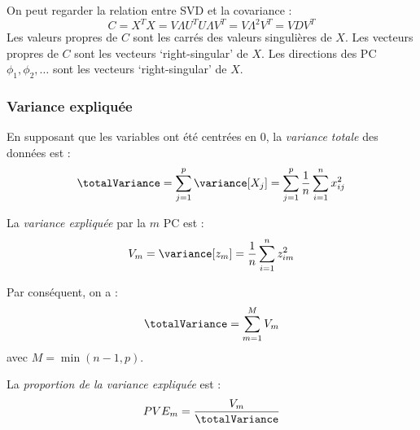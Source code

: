                 On peut regarder la relation entre SVD et la covariance :
                \[
                    C = X^TX = V\Lambda U^T U\Lambda V^T = V \Lambda^2 V^T = VDV^T
                \]
                Les valeurs propres de \(C\) sont les carrés des valeurs singulières de \(X\). Les vecteurs propres de \(C\) sont les vecteurs `right-singular' de \(X\). Les directions des PC \(\phi_1, \phi_2, \dots\) sont les vecteurs `right-singular' de \(X\).

        \subsubsection{Variance expliquée}
            \begin{definition}
                En supposant que les variables ont été centrées en 0, la \textit{variance totale} des données est :
                \[
                    \totalVariance = \sum_{j=1}^p \variance[X_j] = \sum_{j=1}^p \frac{1}{n} \sum_{i=1}^n x_{ij}^2
                \]

                La \textit{variance expliquée} par la \(m\)\ieme{} PC est :
                \[
                    V_m = \variance[z_m] = \frac{1}{n} \sum_{i=1}^n z_{im}^2
                \]

                Par conséquent, on a :
                \[
                    \totalVariance = \sum_{m = 1}^M V_m
                \]
                avec \(M = \min(n - 1, p)\).

                La \textit{proportion de la variance expliquée} est :
                \[
                    PVE_m = \frac{V_m}{\totalVariance}
                \]
            \end{definition}